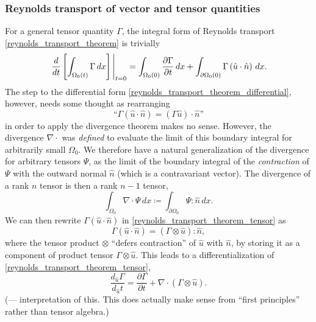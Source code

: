 \documentclass[11pt,a4paper]{memoir}
\newcommand{\Part}[2]{\frac{\partial #1}{\partial #2}}
\begin{document}
\subsubsection{Reynolds transport of vector and tensor quantities}
For a general tensor quantity $\Gamma$, the integral form of Reynolds transport \eqref{reynolds_transport_theorem} is trivially
\begin{equation}\label{reynolds_transport_theorem_tensor}
    \eval{\frac{d}{dt}\left[\int_{\Omega_0(t)}\Gamma\,dx\right]}_{t=0} =
        \int_{\Omega_0(0)}\Part{\Gamma}{t}\,dx + \int_{\partial\Omega_0(0)}\Gamma \left(\hat{u}\cdot\hat{n}\right) \,dx.
\end{equation}
The step to the differential form \eqref{reynolds_transport_theorem_differential}, however, needs some thought
as rearranging
    $$\text{``}\Gamma\left(\hat{u}\cdot \hat{n}\right) = (\Gamma\hat{u})\cdot \hat{n}\text{''}$$
in order to apply the divergence theorem makes no sense. However, the divergence $\nabla \cdot$ was \textit{defined}
to evaluate the limit of this boundary integral for arbitrarily small $\Omega_0$. We therefore have a natural generalization of the
divergence for arbitrary tensors $\Psi$, as the limit of the boundary integral of the \textit{contraction} of $\Psi$ with the outward normal
$\hat{n}$ (which is a contravariant vector). The divergence of a rank $n$ tensor is then a rank $n-1$ tensor,
\begin{equation}\label{tensor_divergence}
    \int_{\Omega_0} \nabla\cdot\Psi\,dx \coloneqq
        \int_{\partial{\Omega_0}} \Psi : \hat{n}\,dx.
\end{equation}
We can then rewrite $\Gamma \left(\hat{u}\cdot \hat{n}\right)$ in \eqref{reynolds_transport_theorem_tensor} as
    $$\Gamma \left(\hat{u}\cdot \hat{n}\right) = \left(\Gamma \otimes \hat{u}\right) : \hat{n},$$
where the tensor product $\otimes$ ``defers contraction'' of $\hat{u}$ with $\hat{n}$, by storing it as a component of product tensor $\Gamma \otimes \hat{u}$.
This leads to a differentialization of \eqref{reynolds_transport_theorem_tensor},
\begin{equation}\label{reynolds_transport_theorem_tensor_differential}
    \frac{d_{\hat{u}}\Gamma}{d_{\hat{u}}t} = \Part{\Gamma}{t} + \nabla \cdot(\Gamma \otimes \hat{u}).
\end{equation}
(--- interpretation of this. This does actually make sense from ``first principles'' rather than tensor algebra.)
\end{document}

